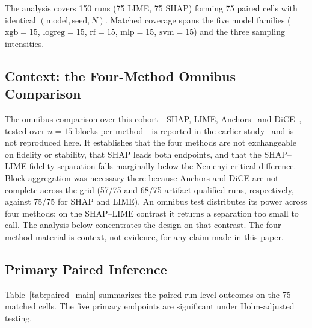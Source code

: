 \documentclass{cleiej}
\begin{document}
The analysis covers 150 runs (75 LIME, 75 SHAP) forming 75 paired cells
with identical $(\mathrm{model}, \mathrm{seed}, N)$. Matched coverage spans
the five model families ($\mathrm{xgb}=15$, $\mathrm{logreg}=15$,
$\mathrm{rf}=15$, $\mathrm{mlp}=15$, $\mathrm{svm}=15$) and the three
sampling intensities.

\subsection{Context: the Four-Method Omnibus Comparison}

The omnibus comparison over this cohort---SHAP, LIME,
Anchors~\cite{ribeiro2018anchors} and DiCE~\cite{mothilal2020dice}, tested
over $n=15$ blocks per method---is reported in the earlier
study~\cite{herrera2026framework} and is not reproduced here. It
establishes that the four methods are not exchangeable on fidelity or
stability, that SHAP leads both endpoints, and that the SHAP--LIME fidelity
separation falls marginally below the Nemenyi critical difference. Block
aggregation was necessary there because Anchors and DiCE are not complete
across the grid (57/75 and 68/75 artifact-qualified runs, respectively,
against 75/75 for SHAP and LIME). An omnibus test distributes its power
across four methods; on the SHAP--LIME contrast it returns a separation too
small to call. The analysis below concentrates the design on that contrast.
The four-method material is context, not evidence, for any claim made in
this paper.

\subsection{Primary Paired Inference}

Table~\ref{tab:paired_main} summarizes the paired run-level outcomes on the
75 matched cells. The five primary endpoints are significant under
Holm-adjusted testing.
\end{document}
